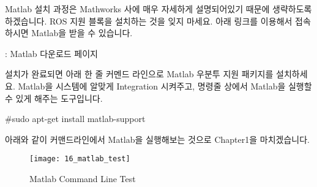 \documentclass[11pt,fleqn]{book} %
\begin{document}
Matlab 설치 과정은 Mathworks 사에 매우 자세하게 설명되어있기 때문에 생략하도록 하겠습니다.
ROS 지원 블록을 설치하는 것을 잊지 마세요. 아래 링크를 이용해서 접속하시면 Matlab을 받을 수 있습니다.

\begin{link}[http://kr.mathworks.com/downloads/web\_downloads/?s\_tid=srchtitle   ]
  : Matlab 다운로드 페이지
\end{link}

설치가 완료되면 아래 한 줄 커멘드 라인으로 Matlab 우분투 지원 패키지를 설치하세요. Matlab을 시스템에 알맞게 Integration 시켜주고, 명령줄 상에서 Matlab을 실행할 수 있게 해주는 도구입니다.

\#sudo apt-get install matlab-support

아래와 같이 커맨드라인에서 Matlab을 실행해보는 것으로 Chapter1을 마치겠습니다.

\begin{figure}[h]
\centering\texttt{[image: 16\_matlab\_test]}
\caption{Matlab Command Line Test}
\end{figure}

\end{document}
